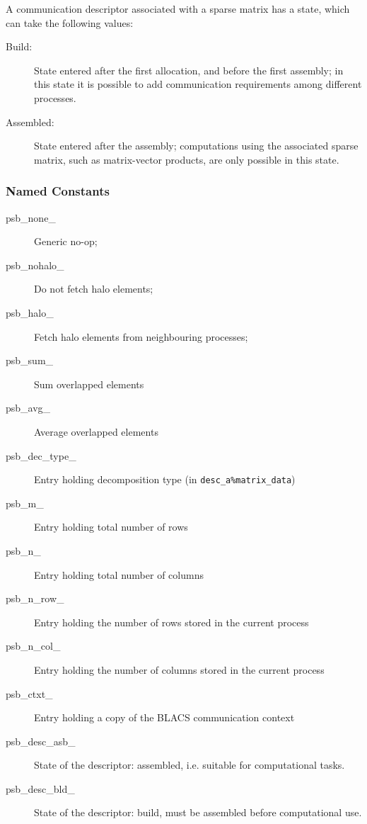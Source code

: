 A communication descriptor associated with a sparse  matrix has a
state, which can take the following values:
\begin{description}
\item[Build:] State entered after the first allocation, and before the
  first assembly; in this state it is possible to add communication
  requirements among different processes. 
\item[Assembled:] State entered after the assembly; computations using
  the associated sparse matrix, such as matrix-vector products, are
  only possible   in this state.
\end{description}
\subsubsection{Named Constants}
\label{sec:cd_constants}
\begin{description}
\item[psb\_none\_] Generic no-op;
\item[psb\_nohalo\_]  Do not fetch halo elements;
\item[psb\_halo\_]  Fetch halo elements from neighbouring processes;
\item[psb\_sum\_] Sum overlapped elements
\item[psb\_avg\_] Average overlapped elements
\item[psb\_dec\_type\_] Entry holding decomposition type (in \verb|desc_a%matrix_data|)
\item[psb\_m\_] Entry holding total number of rows
\item[psb\_n\_] Entry holding total number of columns
\item[ psb\_n\_row\_] Entry holding the number of rows stored in the
  current process
\item[psb\_n\_col\_] Entry holding the number of columns stored in the
  current process
\item[psb\_ctxt\_] Entry holding a copy of the BLACS communication context
\item[psb\_desc\_asb\_] State of the descriptor: assembled,
      i.e. suitable for computational tasks. 
\item[psb\_desc\_bld\_] State of the descriptor: build, must be
  assembled before computational use.
\end{description}



